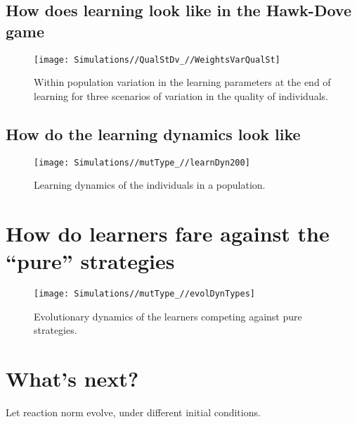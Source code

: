 \documentclass[]{article}
\begin{document}
\hypertarget{how-does-learning-look-like-in-the-hawk-dove-game}{%
\subsection{How does learning look like in the Hawk-Dove
game}\label{how-does-learning-look-like-in-the-hawk-dove-game}}

\begin{figure}
\texttt{[image: Simulations//QualStDv\_//WeightsVarQualSt]} \caption{\label{fig:AC_HD}Within population variation in the learning parameters at the end of learning for three scenarios of variation in the quality of individuals.}\label{fig:fig6}
\end{figure}

\hypertarget{how-do-the-learning-dynamics-look-like}{%
\subsection{How do the learning dynamics look
like}\label{how-do-the-learning-dynamics-look-like}}

\begin{figure}
\texttt{[image: Simulations//mutType\_//learnDyn200]} \caption{\label{fig:learn_dyn}Learning dynamics of the individuals in a population.}\label{fig:fig7}
\end{figure}

\hypertarget{how-do-learners-fare-against-the-pure-strategies}{%
\section{How do learners fare against the ``pure''
strategies}\label{how-do-learners-fare-against-the-pure-strategies}}

\begin{figure}
\texttt{[image: Simulations//mutType\_//evolDynTypes]} \caption{\label{fig:types_comp}Evolutionary dynamics of the learners competing against pure strategies.}\label{fig:fig8}
\end{figure}

\hypertarget{whats-next}{%
\section{What's next?}\label{whats-next}}

Let reaction norm evolve, under different initial conditions.
\end{document}
